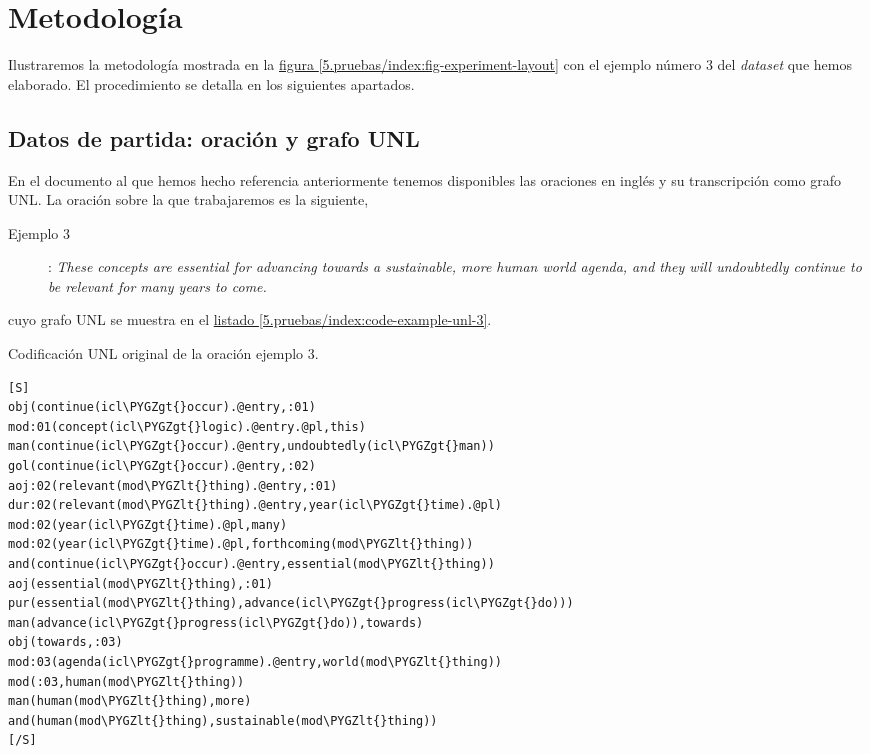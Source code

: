 \documentclass[a4paper,12pt,spanish]{book}
\def\PYGZlt{\char`\<}
\def\PYGZgt{\char`\>}
\begin{document}
\section{Metodología}
\label{5.pruebas/index:metodologia}
Ilustraremos la metodología mostrada en la \hyperref[5.pruebas/index:fig-experiment-layout]{figura  \ref*{5.pruebas/index:fig-experiment-layout}} con
el ejemplo número 3 del \emph{dataset} que hemos elaborado. El procedimiento se detalla
en los siguientes apartados.


\subsection{Datos de partida: oración y grafo UNL}
\label{5.pruebas/index:datos-de-partida-oracion-y-grafo-unl}
En el documento al que hemos hecho referencia anteriormente tenemos disponibles las
oraciones en inglés y su transcripción como grafo UNL. La oración sobre la que
trabajaremos es la siguiente,
\begin{description}
\item[{Ejemplo 3}] \leavevmode
: \emph{These concepts are essential for advancing towards a sustainable, more human world agenda, and they will undoubtedly continue to be relevant for many years to come.}

\end{description}

cuyo grafo UNL se muestra en el \hyperref[5.pruebas/index:code-example-unl-3]{listado  \ref*{5.pruebas/index:code-example-unl-3}}.

\begin{literal-block}
\caption{Codificación UNL original de la oración ejemplo 3.}
\begin{Verbatim}[commandchars=\\\{\}]
[S]
obj(continue(icl\PYGZgt{}occur).@entry,:01)
mod:01(concept(icl\PYGZgt{}logic).@entry.@pl,this)
man(continue(icl\PYGZgt{}occur).@entry,undoubtedly(icl\PYGZgt{}man))
gol(continue(icl\PYGZgt{}occur).@entry,:02)
aoj:02(relevant(mod\PYGZlt{}thing).@entry,:01)
dur:02(relevant(mod\PYGZlt{}thing).@entry,year(icl\PYGZgt{}time).@pl)
mod:02(year(icl\PYGZgt{}time).@pl,many)
mod:02(year(icl\PYGZgt{}time).@pl,forthcoming(mod\PYGZlt{}thing))
and(continue(icl\PYGZgt{}occur).@entry,essential(mod\PYGZlt{}thing))
aoj(essential(mod\PYGZlt{}thing),:01)
pur(essential(mod\PYGZlt{}thing),advance(icl\PYGZgt{}progress(icl\PYGZgt{}do)))
man(advance(icl\PYGZgt{}progress(icl\PYGZgt{}do)),towards)
obj(towards,:03)
mod:03(agenda(icl\PYGZgt{}programme).@entry,world(mod\PYGZlt{}thing))
mod(:03,human(mod\PYGZlt{}thing))
man(human(mod\PYGZlt{}thing),more)
and(human(mod\PYGZlt{}thing),sustainable(mod\PYGZlt{}thing))
[/S]
\end{Verbatim}
\label{5.pruebas/index:code-example-unl-3}
\end{literal-block}
\end{document}
